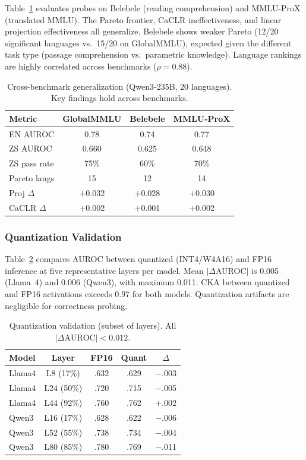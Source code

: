 \documentclass[11pt,a4paper]{article}
\newcommand{\auroc}{AUROC}
\begin{document}
Table~\ref{tab:benchmarks} evaluates probes on Belebele (reading comprehension) and MMLU-ProX (translated MMLU). The Pareto frontier, CaCLR ineffectiveness, and linear projection effectiveness all generalize. Belebele shows weaker Pareto (12/20 significant languages vs.\ 15/20 on GlobalMMLU), expected given the different task type (passage comprehension vs.\ parametric knowledge). Language rankings are highly correlated across benchmarks ($\rho=0.88$).

\begin{table}[t]
\centering
\small
\begin{tabular}{lccc}
\toprule
Metric & GlobalMMLU & Belebele & MMLU-ProX \\
\midrule
EN \auroc{} & 0.78 & 0.74 & 0.77 \\
ZS \auroc{} & 0.660 & 0.625 & 0.648 \\
ZS pass rate & 75\% & 60\% & 70\% \\
Pareto langs & 15 & 12 & 14 \\
Proj $\Delta$ & $+$0.032 & $+$0.028 & $+$0.030 \\
CaCLR $\Delta$ & $+$0.002 & $+$0.001 & $+$0.002 \\
\bottomrule
\end{tabular}
\caption{Cross-benchmark generalization (Qwen3-235B, 20 languages). Key findings hold across benchmarks.}
\label{tab:benchmarks}
\end{table}


\subsubsection{Quantization Validation}
\label{sec:quant}

Table~\ref{tab:quant} compares \auroc{} between quantized (INT4/W4A16) and FP16 inference at five representative layers per model. Mean $|\Delta$\auroc{}$|$ is 0.005 (Llama~4) and 0.006 (Qwen3), with maximum 0.011. CKA between quantized and FP16 activations exceeds 0.97 for both models. Quantization artifacts are negligible for correctness probing.

\begin{table}[t]
\centering
\small
\begin{tabular}{lcccc}
\toprule
Model & Layer & FP16 & Quant & $\Delta$ \\
\midrule
Llama4 & L8 (17\%)  & .632 & .629 & $-$.003 \\
Llama4 & L24 (50\%) & .720 & .715 & $-$.005 \\
Llama4 & L44 (92\%) & .760 & .762 & $+$.002 \\
Qwen3  & L16 (17\%) & .628 & .622 & $-$.006 \\
Qwen3  & L52 (55\%) & .738 & .734 & $-$.004 \\
Qwen3  & L80 (85\%) & .780 & .769 & $-$.011 \\
\bottomrule
\end{tabular}
\caption{Quantization validation (subset of layers). All $|\Delta\text{\auroc{}}| < 0.012$.}
\label{tab:quant}
\end{table}
\end{document}
